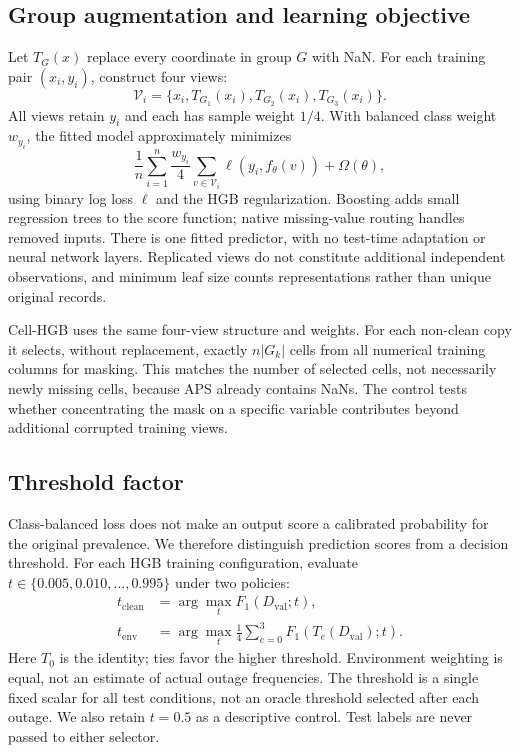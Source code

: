 \documentclass[conference]{IEEEtran}
\begin{document}
\subsection{Group augmentation and learning objective}
Let $T_G(x)$ replace every coordinate in group $G$ with NaN. For each training pair $(x_i,y_i)$, construct four views:
\begin{equation}
\mathcal V_i=\{x_i,T_{G_1}(x_i),T_{G_2}(x_i),T_{G_3}(x_i)\}.
\end{equation}
All views retain $y_i$ and each has sample weight $1/4$. With balanced class weight $w_{y_i}$, the fitted model approximately minimizes
\begin{equation}
 \frac1n\sum_{i=1}^n\frac{w_{y_i}}4
 \sum_{v\in\mathcal V_i}\ell(y_i,f_\theta(v))+
 \Omega(\theta),
\end{equation}
using binary log loss $\ell$ and the HGB regularization. Boosting adds small regression trees to the score function; native missing-value routing handles removed inputs. There is one fitted predictor, with no test-time adaptation or neural network layers. Replicated views do not constitute additional independent observations, and minimum leaf size counts representations rather than unique original records.

Cell-HGB uses the same four-view structure and weights. For each non-clean copy it selects, without replacement, exactly $n|G_k|$ cells from all numerical training columns for masking. This matches the number of selected cells, not necessarily newly missing cells, because APS already contains NaNs. The control tests whether concentrating the mask on a specific variable contributes beyond additional corrupted training views.

\subsection{Threshold factor}
Class-balanced loss does not make an output score a calibrated probability for the original prevalence. We therefore distinguish prediction scores from a decision threshold. For each HGB training configuration, evaluate $t\in\{0.005,0.010,\ldots,0.995\}$ under two policies:
\begin{align}
 t_{\mathrm{clean}}&=\arg\max_t F_1(D_{\mathrm{val}};t),\\
 t_{\mathrm{env}}&=\arg\max_t \frac14\sum_{e=0}^{3}F_1(T_e(D_{\mathrm{val}});t).
\end{align}
Here $T_0$ is the identity; ties favor the higher threshold. Environment weighting is equal, not an estimate of actual outage frequencies. The threshold is a single fixed scalar for all test conditions, not an oracle threshold selected after each outage. We also retain $t=0.5$ as a descriptive control. Test labels are never passed to either selector.
\end{document}
